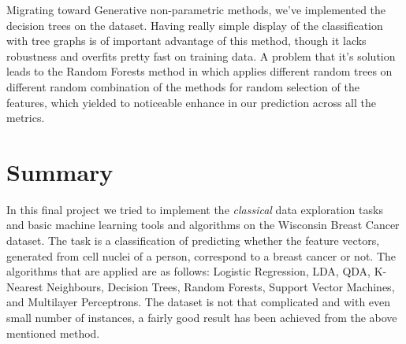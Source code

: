 \documentclass[12pt, a4paper]{scrartcl}
\begin{document}
Migrating toward Generative non-parametric methods, we've implemented the decision trees on the dataset. Having really simple display of the classification with tree graphs is of important advantage of this method, though it lacks robustness and overfits pretty fast on training data. A problem that it's solution leads to the Random Forests method in which applies different random trees on different random combination of the methods for random selection of the features, which yielded to noticeable enhance in our prediction across all the metrics. 





\section{Summary } In this final project we tried to implement the \emph{classical} data exploration tasks and basic machine learning tools and algorithms on the Wisconsin Breast Cancer dataset. The task is a classification of predicting whether the feature vectors, generated from cell nuclei of a person, correspond to a breast cancer or not. The algorithms that are applied are as follows: Logistic Regression, LDA, QDA, K-Nearest Neighbours, Decision Trees, Random Forests, Support Vector Machines, and Multilayer Perceptrons. The dataset is not that complicated and with even small number of instances, a fairly good result has been achieved from the above mentioned method.
\label{sec:sum}





\end{document}
